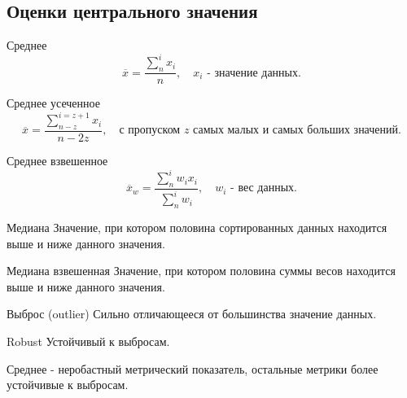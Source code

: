 \subsection{Оценки центрального значения}
\begin{terms}
    \item[Среднее]
    \begin{equation*}
        \overline{x} = \frac{\sum_{n}^{i} x_i}{n}, \quad
        \text{$x_i$ - значение данных.}
    \end{equation*}
    \item[Среднее усеченное]
    \begin{equation*}
        \overline{x} = \frac{\sum_{n-z}^{i=z+1} x_i}{n - 2z}, \quad
    \text{с пропуском $z$ самых малых и самых больших значений.}
    \end{equation*}
    \item[Среднее взвешенное]
    \begin{equation*}
        \overline{x}_w = \frac{\sum_{n}^{i} w_i x_i}{\sum_{n}^{i} w_i}, \quad
        \text{$w_i$ - вес данных.}
    \end{equation*}
    \item[Медиана] Значение, при котором половина сортированных данных находится
    выше и ниже данного значения.
    \item[Медиана взвешенная] Значение, при котором половина суммы весов находится
    выше и ниже данного значения.
    \\\hline
    \item[Выброс (outlier)] Сильно отличающееся от большинства значение данных.
    \item[Robust] Устойчивый к выбросам.
\end{terms}
Среднее - неробастный метрический показатель, остальные метрики более устойчивые к выбросам.

